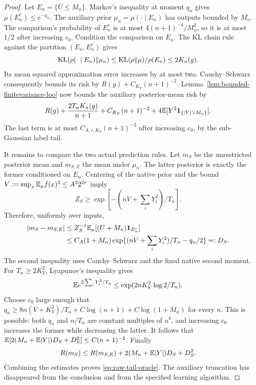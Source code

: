 \begin{proof}
Let $E_n=\{U\le M_n\}$. Markov's inequality at moment $q_n$ gives
$\mu(E_n^c)\le e^{-q_n}$. The auxiliary prior
$\mu_n=\mu(\cdot\mid E_n)$ has outputs bounded by $M_n$.
The comparison's probability of $E_n^c$ is at most
$4(n+1)^{-4}/M_n^2$, so it is at most $1/2$ after increasing $c_0$.
Condition the comparison on $E_n$. The KL chain rule against the
partition $(E_n,E_n^c)$ gives
\[
 \operatorname{KL}(\rho(\cdot\mid E_n)\Vert\mu_n)
        \le\operatorname{KL}(\rho\Vert\mu)/\rho(E_n)\le2K_n(g).
\]
Its mean squared approximation error increases by at most two.
Cauchy--Schwarz consequently bounds its risk by
$R(g)+C_{K_Y}(n+1)^{-2}$. Lemma~\ref{lem:bounded-finitevariance-loo}
now bounds the auxiliary posterior-mean risk by
\[
 R(g)+\frac{2T_nK_n(g)}{n+1}
   +C_{K_Y}(n+1)^{-2}
   +4\E[Y^2\mathbf1_{\{|Y|>M_n\}}].
\]
The last term is at most $C_{A,r,K_Y}(n+1)^{-2}$ after increasing
$c_0$, by the sub-Gaussian label tail.

It remains to compare the two actual prediction rules. Let $m_S$ be
the unrestricted posterior mean and $m_{S,E}$ the mean under
$\mu_n$. The latter posterior is exactly the former conditioned on
$E_n$. Centering of the native prior and the bound
$V:=\sup_x\mathbb E_\mu f(x)^2\le A^22^{2r}$ imply
\[
 Z_S\ge\exp[-(nV+\sum_iY_i^2)/T_n].
\]
Therefore, uniformly over inputs,
\begin{align*}
 |m_S-m_{S,E}|
 &\le Z_S^{-1}\mathbb E_\mu[(U+M_n)\mathbf1_{E_n^c}]\\
 &\le C_A(1+M_n)
     \exp\{(nV+\sum_iY_i^2)/T_n-q_n/2\}=:D_S.
\end{align*}
The second inequality uses Cauchy--Schwarz and the fixed native second
moment. For $T_n\ge2K_Y^2$, Lyapunov's inequality gives
\[
 \mathbb E e^{2\sum_iY_i^2/T_n}
 \le\exp(2nK_Y^2\log2/T_n).
\]
Choose $c_0$ large enough that
$q_n\ge8n(V+K_Y^2)/T_n+C\log(n+1)+C\log(1+M_n)$ for every $n$.
This is possible: both $q_n$ and $n/T_n$ are constant multiples of
$n^b$, and increasing $c_0$ increases the former while decreasing
the latter. It follows that
$\mathbb E[2(M_n+\mathbb E|Y|)D_S+D_S^2]\le C(n+1)^{-2}$.
Finally
\[
 R(m_S)\le R(m_{S,E})+
                   2(M_n+\mathbb E|Y|)D_S+D_S^2.
\]
Combining the estimates proves \eqref{eq:raw-tail-oracle}. The
auxiliary truncation has disappeared from the conclusion and from the
specified learning algorithm.
\end{proof}

